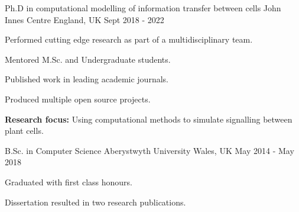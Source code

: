

\begin{cventries}

  \cventry
    {Ph.D in computational modelling of information transfer between cells} %
    {John Innes Centre} %
    {England, UK} %
    {Sept 2018 - 2022} %
    {
      \begin{cvitems} %
        \item {Performed cutting edge research as part of a multidisciplinary team.}
        \item {Mentored M.Sc. and Undergraduate students.}
        \item {Published work in leading academic journals.}
        \item {Produced multiple open source projects.}
        \item {\textbf{Research focus:} Using computational methods to simulate signalling between plant cells.}
      \end{cvitems}
    }

  \cventry
    {B.Sc. in Computer Science} %
    {Aberystwyth University} %
    {Wales, UK} %
    {May 2014 - May 2018} %
    {
      \begin{cvitems} %
        \item {Graduated with first class honours.}
        \item {Dissertation resulted in two research publications.}
      \end{cvitems}
    }

\end{cventries}
